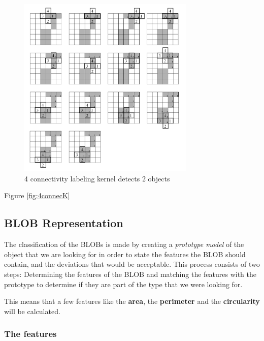 \begin{figure}[htbp]
\centering
\includegraphics[width=0.75\textwidth]{Pictures/Theory/4connec_kernel.png}
\caption{4 connectivity labeling kernel detects 2 objects}
\label{fig:4connecK}
\end{figure}

Figure \eqref{fig:4connecK}

\subsection{BLOB Representation}
The classification of the BLOBs is made by creating a \textit{prototype model} of the object that we are looking for in order to state the features the BLOB should contain, and the deviations that would be acceptable. This process consists of two steps: Determining the features of the BLOB and matching the features with the prototype to determine if they are part of the type that we were looking for.

This means that a few features like the \textbf{area}, the \textbf{perimeter} and the \textbf{circularity} will be calculated.
\subsubsection{The features}

